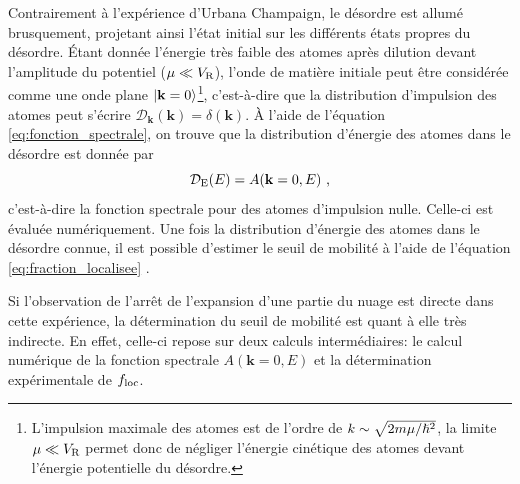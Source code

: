 Contrairement à l'expérience d'Urbana Champaign, le désordre est allumé brusquement, projetant ainsi l'état initial sur les différents états propres du désordre. Étant donnée l'énergie très faible des atomes après dilution devant l'amplitude du potentiel ($\mu\ll V_{\mathrm{R}}$), l'onde de matière initiale peut être considérée comme une onde plane $\left| \mathbf{k}=0 \right\rangle$\footnote{L'impulsion maximale des atomes est de l'ordre de $k\sim\sqrt{2m\mu/\hslash^2}$, la limite $\mu\ll V_{\mathrm{R}}$ permet donc de négliger l'énergie cinétique des atomes devant l'énergie potentielle du désordre.}, c'est-à-dire  que la distribution d'impulsion des atomes peut s'écrire $\mathcal{D}_{\mathbf{k}}(\mathbf{k})=\delta(\mathbf{k})$. À l'aide de l'équation \ref{eq:fonction_spectrale}, on trouve que la distribution d'énergie des atomes dans le désordre est donnée par 
\begin{equation}
\mathcal{D}_{\mathrm{E}}(E) = A(\mathbf{k}=0,E) \text{ ,}
\end{equation}
c'est-à-dire la fonction spectrale pour des atomes d'impulsion nulle. Celle-ci est évaluée numériquement. Une fois la distribution d'énergie des atomes dans le désordre connue, il est possible d'estimer le seuil de mobilité à l'aide de l'équation \ref{eq:fraction_localisee} \citep{piraud2012localisation}.

Si l'observation de l'arrêt de l'expansion d'une partie du nuage est directe dans cette expérience, la détermination du seuil de mobilité est quant à elle très indirecte. En effet, celle-ci repose sur deux calculs intermédiaires: le calcul numérique de la fonction spectrale $A(\mathbf{k}=0,E)$ et la détermination expérimentale de $f_{\mathrm{loc}}$. 



